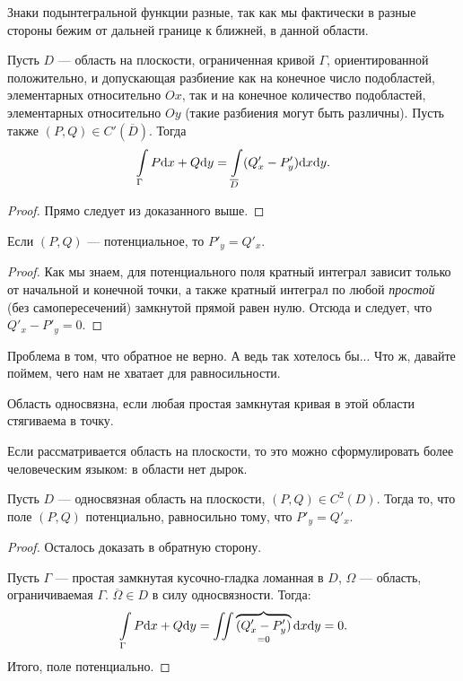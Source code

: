 Знаки подынтегральной функции разные, так как мы фактически в разные стороны бежим от дальней границе к ближней, в данной области.

\begin{Theorem}
Пусть $D$ --- область на плоскости, ограниченная кривой $\Gamma$,  ориентированной положительно, и допускающая разбиение как на конечное число подобластей, элементарных относительно $Ox$, так и на конечное количество подобластей, элементарных относительно $Oy$ (такие разбиения могут быть различны). Пусть также $(P, Q) \in C'(\overline{D})$. Тогда
$$
\int\limits_{\Gamma} P\mathrm{d}x + Q\mathrm{d}  y = \int\limits_{\overline{D}} (Q'_x - P'_y)\mathrm{d}x\mathrm{d} y.
$$
\end{Theorem}
\begin{proof}
Прямо следует из доказанного выше.
\end{proof}

\begin{Consequence}
Если $(P, Q)$ --- потенциальное, то $P'_y = Q'_x$.
\end{Consequence}
\begin{proof}
Как мы знаем, для потенциального поля кратный интеграл зависит только от начальной и конечной точки, а также кратный интеграл по любой \textit{простой} (без самопересечений) замкнутой прямой равен нулю. Отсюда и следует, что $Q'_x - P'_y = 0$.
\end{proof}

Проблема в том, что обратное не верно. А ведь так хотелось бы... Что ж, давайте поймем, чего нам не хватает для равносильности.

\begin{Def}
Область односвязна, если любая простая замкнутая кривая в этой области стягиваема в точку.
\end{Def}
Если рассматривается область на плоскости, то это можно сформулировать более человеческим языком: в области нет дырок.

\begin{Theorem}
Пусть $D$ --- односвязная область на плоскости, $(P, Q) \in C^2(D)$. Тогда то, что поле $(P, Q)$ потенциально, равносильно тому, что $P'_y = Q'_x$.
\end{Theorem}
\begin{proof}
Осталось доказать в обратную сторону.

Пусть $\Gamma$ --- простая замкнутая кусочно-гладка ломанная в $D$, $\Omega$ --- область, ограничиваемая $\Gamma$. $\overline \Omega \in D$ в силу односвязности. Тогда: 
$$
\int\limits_{\Gamma} P\mathrm{d}x + Q\mathrm{d} y = \iint\overbrace{(Q'_x - P'_y)}_{=0}\mathrm{d}x \mathrm{d} y = 0.
$$
Итого, поле потенциально.
\end{proof}

